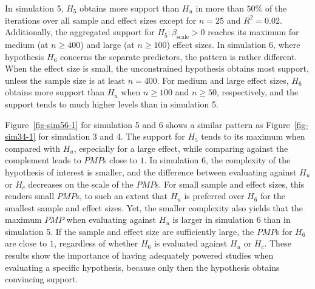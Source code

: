\documentclass[
  authoryear,
  preprint,
  5p,
  twocolumn]{elsarticle}
\begin{document}
In simulation 5, \(H_5\) obtains more support than \(H_u\) in more than
\(50\%\) of the iterations over all sample and effect sizes except for
\(n = 25\) and \(R^2 = 0.02\). Additionally, the aggregated support for
\(H_5: \beta_{\text{scale}}>0\) reaches its maximum for medium (at
\(n \geq 400\)) and large (at \(n \geq 100\)) effect sizes. In
simulation 6, where hypothesis \(H_6\) concerns the separate predictors,
the pattern is rather different. When the effect size is small, the
unconstrained hypothesis obtains most support, unless the sample size is
at least \(n = 400\). For medium and large effect sizes, \(H_6\) obtains
more support than \(H_u\) when \(n \geq 100\) and \(n \geq 50\),
respectively, and the support tends to much higher levels than in
simulation 5.

Figure~\ref{fig-sim56-1} for simulation 5 and 6 shows a similar pattern
as Figure~\ref{fig-sim34-1} for simulation 3 and 4. The support for
\(H_5\) tends to its maximum when compared with \(H_u\), especially for
a large effect, while comparing against the complement leads to \(PMP\)s
close to \(1\). In simulation 6, the complexity of the hypothesis of
interest is smaller, and the difference between evaluating against
\(H_u\) or \(H_c\) decreases on the scale of the \(PMP\)s. For small
sample and effect sizes, this renders small \(PMP\)s, to such an extent
that \(H_u\) is preferred over \(H_6\) for the smallest sample and
effect sizes. Yet, the smaller complexity also yields that the maximum
\(PMP\) when evaluating against \(H_u\) is larger in simulation 6 than
in simulation 5. If the sample and effect size are sufficiently large,
the \(PMP\)s for \(H_6\) are close to \(1\), regardless of whether
\(H_6\) is evaluated against \(H_u\) or \(H_c\). These results show the
importance of having adequately powered studies when evaluating a
specific hypothesis, because only then the hypothesis obtains convincing
support.
\end{document}
